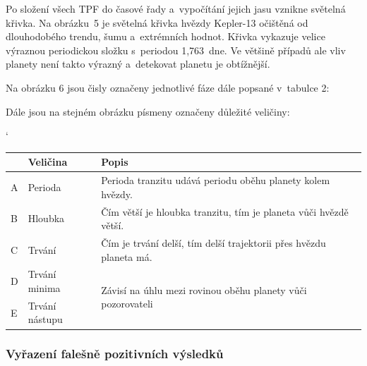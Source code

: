 \documentclass[a4paper,12pt]{article}
\begin{document}
{Po složení všech TPF do časové řady a~vypočítání jejich jasu vznikne světelná křivka. Na obrázku~5 je světelná křivka hvězdy Kepler-13 očištěná od dlouhodobého trendu, šumu a~extrémních hodnot. Křivka vykazuje velice výraznou periodickou složku s~periodou 1,763~dne. Ve většině případů ale vliv planety není takto výrazný a~detekovat planetu je obtížnější.


Na obrázku 6 jsou čisly označeny jednotlivé fáze dále popsané v~tabulce 2:

{

Dále jsou na stejném obrázku písmeny označeny důležité veličiny:

{\catcode` {
\begin{tabular}{|ll|l|}
    \hline
    \rowcolor{lightgray}
     & Veličina & Popis \\
     \hline
     A & Perioda & Perioda tranzitu udává periodu oběhu planety kolem hvězdy. \\
     \hline
     B & Hloubka & Čím větší je hloubka tranzitu, tím je planeta vůči hvězdě větší. \\
     \hline
     C & Trvání & Čím je trvání delší, tím delší trajektorii přes hvězdu planeta má. \\ 
     \hline
     D & Trvání minima & \multirow{2}{*}{Závisí na úhlu mezi rovinou oběhu planety vůči pozorovateli} \\
     \cline{1-2}
     E & Trvání nástupu & \\
     \hline
\end{tabular}
}}

\subsubsection{Vyřazení falešně pozitivních výsledků}

}}
\end{document}
